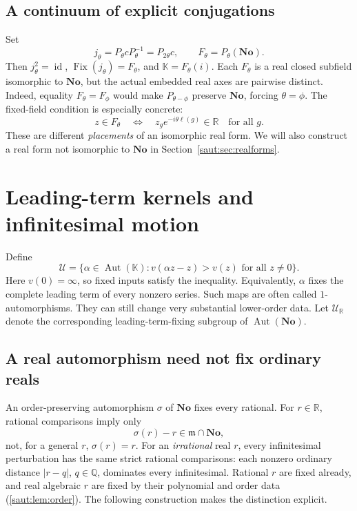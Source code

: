 \documentclass[11pt]{article}
\theoremstyle{definition}
\theoremstyle{remark}
\newcommand{\No}{\mathbf{No}}
\newcommand{\R}{\mathbb R}
\newcommand{\Q}{\mathbb Q}
\newcommand{\K}{\mathbb K}
\newcommand{\mm}{\mathfrak m}
\newcommand{\U}{\mathcal U}
\newcommand{\id}{\operatorname{id}}
\newcommand{\Aut}{\operatorname{Aut}}
\newcommand{\Fix}{\operatorname{Fix}}
\numberwithin{equation}{section}
\begin{document}
\subsection{A continuum of explicit conjugations}

Set
\begin{equation}\label{saut:eq:twistedconj}
 j_\theta=P_\theta cP_\theta^{-1}=P_{2\theta}c,
 \qquad F_\theta=P_\theta(\No).
\end{equation}
Then $j_\theta^2=\id$, $\Fix(j_\theta)=F_\theta$, and
$\K=F_\theta(i)$. Each $F_\theta$ is a real closed subfield isomorphic to
$\No$, but the actual embedded real axes are pairwise distinct.
Indeed, equality $F_\theta=F_\phi$ would make $P_{\theta-\phi}$ preserve
$\No$, forcing $\theta=\phi$. The fixed-field condition is especially
concrete:
\begin{equation}\label{saut:eq:twistedcoeff}
 z\in F_\theta\quad\Longleftrightarrow\quad
 z_g e^{-i\theta\ell(g)}\in\R\quad\text{for all }g.
\end{equation}
These are different \emph{placements} of an isomorphic real form. We will
also construct a real form not isomorphic to $\No$ in
Section~\ref{saut:sec:realforms}.

\section{Leading-term kernels and infinitesimal motion}\label{saut:sec:kernels}

Define
\begin{equation}\label{saut:eq:U}
 \U=\{\alpha\in\Aut(\K):
       v(\alpha z-z)>v(z)\text{ for all }z\ne0\}.
\end{equation}
Here $v(0)=\infty$, so fixed inputs satisfy the inequality. Equivalently,
$\alpha$ fixes the complete leading term of every nonzero series.
Such maps are often called $1$-automorphisms. They can still change very
substantial lower-order data. Let $\U_{\R}$ denote the corresponding
leading-term-fixing subgroup of $\Aut(\No)$.

\subsection{A real automorphism need not fix ordinary reals}

An order-preserving automorphism $\sigma$ of $\No$ fixes every rational.
For $r\in\R$, rational comparisons imply only
\[
 \sigma(r)-r\in\mm\cap\No,
\]
not, for a general $r$, $\sigma(r)=r$. For an \emph{irrational} real $r$,
every infinitesimal perturbation has the same strict rational comparisons:
each nonzero ordinary distance $|r-q|$, $q\in\Q$, dominates every
infinitesimal. Rational $r$ are fixed already, and real algebraic $r$ are
fixed by their polynomial and order data (\cref{saut:lem:order}).
The following construction makes the distinction explicit.
\end{document}
